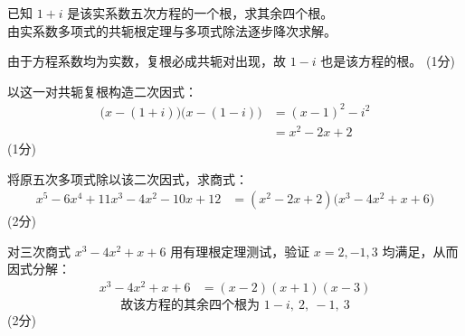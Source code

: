 \documentclass[12pt,a4paper]{exam-zh}
\newcommand{\qscoreoffset}{4em}
\newcommand{\qscore}[1]{%
    \leavevmode\unskip\nobreak\hfill
    \makebox[0pt][l]{\makebox[\qscoreoffset][r]{(#1\%)}}%
}
\begin{document}
\begin{solution}
    已知 $1+i$ 是该实系数五次方程的一个根，求其余四个根。 \\
    由实系数多项式的共轭根定理与多项式除法逐步降次求解。

    由于方程系数均为实数，复根必成共轭对出现，故 $1-i$ 也是该方程的根。
    \hfill (1分)

    以这一对共轭复根构造二次因式：
    \begin{align*}
        \big(x-(1+i)\big)\big(x-(1-i)\big) &= (x-1)^2 - i^2 \\
        &= x^2 - 2x + 2
    \end{align*}
    \hfill (1分)

    将原五次多项式除以该二次因式，求商式：
    \begin{align*}
        x^5 - 6x^4 + 11x^3 - 4x^2 - 10x + 12 &= (x^2-2x+2)\big(x^3-4x^2+x+6\big)
    \end{align*}
    \hfill (2分)

    对三次商式 $x^3-4x^2+x+6$ 用有理根定理测试，验证 $x=2,-1,3$ 均满足，从而因式分解：
    \begin{align*}
        x^3-4x^2+x+6 &= (x-2)(x+1)(x-3)
    \end{align*}
    \[
        \text{故该方程的其余四个根为 } 1-i,\ 2,\ -1,\ 3
    \]
    \hfill (2分)
\end{solution}



\end{document}
